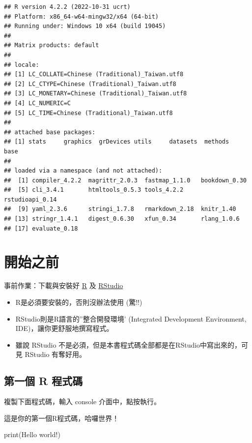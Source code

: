 \documentclass[
]{book}
\newenvironment{Shaded}{\begin{snugshade}}{\end{snugshade}}
\newcommand{\FunctionTok}[1]{\textcolor[rgb]{0.00,0.00,0.00}{#1}}
\newcommand{\NormalTok}[1]{#1}
\newcommand{\StringTok}[1]{\textcolor[rgb]{0.31,0.60,0.02}{#1}}
\begin{document}
\begin{verbatim}
## R version 4.2.2 (2022-10-31 ucrt)
## Platform: x86_64-w64-mingw32/x64 (64-bit)
## Running under: Windows 10 x64 (build 19045)
## 
## Matrix products: default
## 
## locale:
## [1] LC_COLLATE=Chinese (Traditional)_Taiwan.utf8 
## [2] LC_CTYPE=Chinese (Traditional)_Taiwan.utf8   
## [3] LC_MONETARY=Chinese (Traditional)_Taiwan.utf8
## [4] LC_NUMERIC=C                                 
## [5] LC_TIME=Chinese (Traditional)_Taiwan.utf8    
## 
## attached base packages:
## [1] stats     graphics  grDevices utils     datasets  methods   base     
## 
## loaded via a namespace (and not attached):
##  [1] compiler_4.2.2  magrittr_2.0.3  fastmap_1.1.0   bookdown_0.30  
##  [5] cli_3.4.1       htmltools_0.5.3 tools_4.2.2     rstudioapi_0.14
##  [9] yaml_2.3.6      stringi_1.7.8   rmarkdown_2.18  knitr_1.40     
## [13] stringr_1.4.1   digest_0.6.30   xfun_0.34       rlang_1.0.6    
## [17] evaluate_0.18
\end{verbatim}

\hypertarget{ux958bux59cbux4e4bux524d}{%
\chapter{開始之前}\label{ux958bux59cbux4e4bux524d}}

事前作業：下載與安裝好 \href{https://cran.r-project.org/}{R} 及 \href{https://posit.co/download/rstudio-desktop/}{RStudio}

\begin{itemize}
\item
  R是必須要安裝的，否則沒辦法使用 (驚!!)
\item
  RStudio則是R語言的''整合開發環境'
  (Integrated Development Environment, IDE)，讓你更舒服地撰寫程式。
\item
  雖說 RStudio 不是必須，但是本書程式碼全部都是在RStudio中寫出來的，可見 RStudio 有奪好用。
  　
  　
\end{itemize}

\hypertarget{ux7b2cux4e00ux500b-r-ux7a0bux5f0fux78bc}{%
\section{第一個 R 程式碼}\label{ux7b2cux4e00ux500b-r-ux7a0bux5f0fux78bc}}

複製下面程式碼，輸入 console 介面中，點按執行。

這是你的第一個R程式碼，哈囉世界！

\begin{Shaded}
\begin{Highlighting}[]
\FunctionTok{print}\NormalTok{(}\StringTok{\textquotesingle{}Hello world!\textquotesingle{}}\NormalTok{)}
\end{Highlighting}
\end{Shaded}
\end{document}
